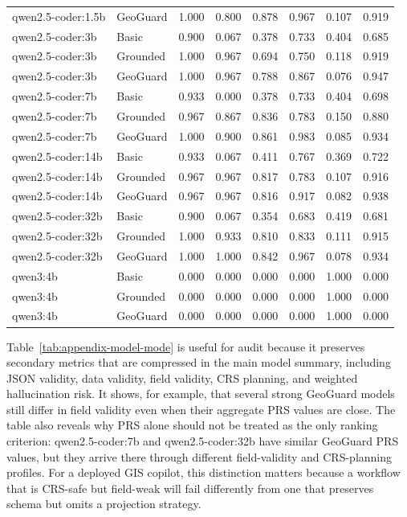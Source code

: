 \documentclass[]{interact}
\begin{document}
\begin{table}[htbp]
\begin{tabular}{llrrrrrr}
qwen2.5-coder:1.5b & GeoGuard & 1.000 & 0.800 & 0.878 & 0.967 & 0.107 & 0.919 \\
qwen2.5-coder:3b & Basic & 0.900 & 0.067 & 0.378 & 0.733 & 0.404 & 0.685 \\
qwen2.5-coder:3b & Grounded & 1.000 & 0.967 & 0.694 & 0.750 & 0.118 & 0.919 \\
qwen2.5-coder:3b & GeoGuard & 1.000 & 0.967 & 0.788 & 0.867 & 0.076 & 0.947 \\
qwen2.5-coder:7b & Basic & 0.933 & 0.000 & 0.378 & 0.733 & 0.404 & 0.698 \\
qwen2.5-coder:7b & Grounded & 0.967 & 0.867 & 0.836 & 0.783 & 0.150 & 0.880 \\
qwen2.5-coder:7b & GeoGuard & 1.000 & 0.900 & 0.861 & 0.983 & 0.085 & 0.934 \\
qwen2.5-coder:14b & Basic & 0.933 & 0.067 & 0.411 & 0.767 & 0.369 & 0.722 \\
qwen2.5-coder:14b & Grounded & 0.967 & 0.967 & 0.817 & 0.783 & 0.107 & 0.916 \\
qwen2.5-coder:14b & GeoGuard & 0.967 & 0.967 & 0.816 & 0.917 & 0.082 & 0.938 \\
qwen2.5-coder:32b & Basic & 0.900 & 0.067 & 0.354 & 0.683 & 0.419 & 0.681 \\
qwen2.5-coder:32b & Grounded & 1.000 & 0.933 & 0.810 & 0.833 & 0.111 & 0.915 \\
qwen2.5-coder:32b & GeoGuard & 1.000 & 1.000 & 0.842 & 0.967 & 0.078 & 0.934 \\
qwen3:4b & Basic & 0.000 & 0.000 & 0.000 & 0.000 & 1.000 & 0.000 \\
qwen3:4b & Grounded & 0.000 & 0.000 & 0.000 & 0.000 & 1.000 & 0.000 \\
qwen3:4b & GeoGuard & 0.000 & 0.000 & 0.000 & 0.000 & 1.000 & 0.000 \\
\bottomrule
\end{tabular}
\end{table}

Table~\ref{tab:appendix-model-mode} is useful for audit because it preserves secondary metrics that are compressed in the main model summary, including JSON validity, data validity, field validity, CRS planning, and weighted hallucination risk. It shows, for example, that several strong GeoGuard models still differ in field validity even when their aggregate PRS values are close. The table also reveals why PRS alone should not be treated as the only ranking criterion: qwen2.5-coder:7b and qwen2.5-coder:32b have similar GeoGuard PRS values, but they arrive there through different field-validity and CRS-planning profiles. For a deployed GIS copilot, this distinction matters because a workflow that is CRS-safe but field-weak will fail differently from one that preserves schema but omits a projection strategy.
\end{document}
